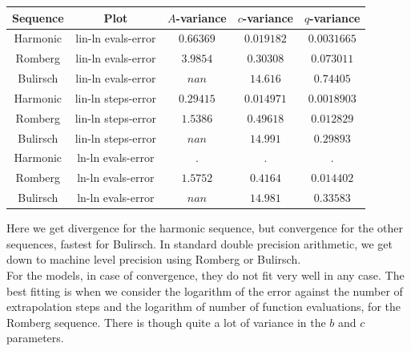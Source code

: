 \begin{table}[H]
    \centering
    \begin{tabular}{c|c||c|c|c}
Sequence & Plot & \(A\)-variance & \(c\)-variance & \(q\)-variance\\\hline
Harmonic & lin-ln evals-error & \(0.66369\) & \(0.019182\) & \(0.0031665\) \\
Romberg & lin-ln evals-error & \(3.9854\) & \(0.30308\) & \(0.073011\) \\
Bulirsch & lin-ln evals-error & \(nan\) & \(14.616\) & \(0.74405\) \\
Harmonic & lin-ln steps-error & \(0.29415\) & \(0.014971\) & \(0.0018903\) \\
Romberg & lin-ln steps-error & \(1.5386\) & \(0.49618\) & \(0.012829\) \\
Bulirsch & lin-ln steps-error & \(nan\) & \(14.991\) & \(0.29893\) \\
Harmonic & ln-ln evals-error & . & . & . \\
Romberg & ln-ln evals-error & \(1.5752\) & \(0.4164\) & \(0.014402\) \\
Bulirsch & ln-ln evals-error & \(nan\) & \(14.981\) & \(0.33583\) \\
    \end{tabular}
    \label{tab:my_label}
\end{table}

Here we get divergence for the harmonic sequence, but convergence for the other sequences, fastest for Bulirsch. In standard double precision arithmetic, we get down to machine level precision using Romberg or Bulirsch.\\

For the models, in case of convergence, they do not fit very well in any case. The best fitting is when we consider the logarithm of the error against the number of extrapolation steps and the logarithm of number of function evaluations, for the Romberg sequence. There is though quite a lot of variance in the \(b\) and \(c\) parameters.

